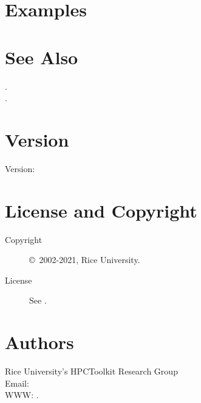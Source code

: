 \documentclass[english]{article}
\begin{document}
\section{Examples}






\section{See Also}

.\\
.\\

\section{Version}

Version: \Version

\section{License and Copyright}

\begin{description}
\item[Copyright] \copyright\ 2002-2021, Rice University.
\item[License] See .
\end{description}

\section{Authors}

\noindent
Rice University's HPCToolkit Research Group \\
Email:  \\
WWW: .

\LatexManEnd
\end{document}
